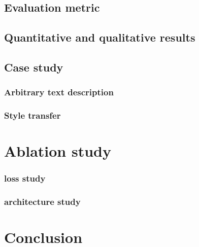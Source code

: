 \documentclass[10pt,twocolumn,letterpaper]{article}
\begin{document}
\subsection{Evaluation metric}
\subsection{Quantitative and qualitative results}



\subsection{Case study}
\subsubsection{Arbitrary text description}
\subsubsection{Style transfer}

\section{Ablation study}
\subsubsection{loss study}
\subsubsection{architecture study}


\section{Conclusion}


{\small


}
\end{document}
